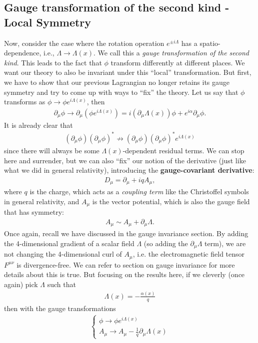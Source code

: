 \documentclass{book}
\numberwithin{equation}{section}
\theoremstyle{definition}
\newcommand{\p}{\partial}
\begin{document}
\subsection{Gauge transformation of the second kind - Local Symmetry}
Now, consider the case where the rotation operation $e^{\pm i \Lambda}$ has a spatio-dependence, i.e., $\Lambda \to \Lambda(x)$. We call this a \textit{gauge transformation of the second kind}. This leads to the fact that $\phi$ transform differently at different places. We want our theory to also be invariant under this ``local'' transformation. But first, we have to show that our previous Lagrangian no longer retains its gauge symmetry and try to come up with ways to ``fix'' the theory. Let us say that $\phi$ transforms as $\phi \to \phi e^{i\Lambda(x)}$, then
\begin{align}
\p_\mu \phi \to \p_\mu (\phi e^{i\Lambda(x)}) = i(\p_\mu \Lambda(x))\phi + e^{i\alpha}\p_\mu \phi.
\end{align}
It is already clear that 
\begin{align}
(\p_\mu \phi)(\p_\mu \phi)^* \not\to (\p_\mu \phi)(\p_\mu \phi)^* e^{i\Lambda(x)}
\end{align}
since there will always be some $\Lambda(x)$-dependent residual terms. We can stop here and surrender, but we can also ``fix'' our notion of the derivative (just like what we did in general relativity), introducing the \textbf{gauge-covariant derivative}:
\begin{align}
D_\mu = \p_\mu + iqA_\mu,
\end{align}
where $q$ is the charge, which acts as a \textit{coupling term} like the Christoffel symbols in general relativity, and $A_\mu$ is the vector potential, which is also the gauge field that has symmetry:
\begin{align}
A_\mu \sim A_\mu + \p_\mu\Lambda.
\end{align}
Once again, recall we have discussed in the gauge invariance section. By adding the 4-dimensional gradient of a scalar field $\Lambda$ (so adding the $\p_\mu \Lambda$ term), we are not changing the 4-dimensional curl of $A_\mu$, i.e. the electromagnetic field tensor $F^{\mu\nu}$ is divergence-free. We can refer to section on gauge invariance for more details about this is true. But focusing on the results here, if we cleverly (once again) pick $\Lambda$ such that
\begin{align}
\Lambda(x) = -\frac{\alpha(x)}{q}
\end{align}
then with the gauge transformations
\begin{align}
\begin{cases}
\phi \to \phi e^{i\Lambda(x)}\\
A_\mu \to A_\mu - \frac{1}{q}\p_\mu\Lambda(x)
\end{cases}
\end{align}
\end{document}
